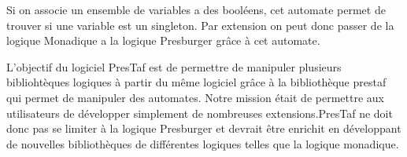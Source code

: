 Si on associe un ensemble de variables a des booléens, cet automate permet de trouver si une variable est un singleton. Par extension on peut donc passer de la logique Monadique a la logique Presburger grâce à cet automate.\\\par

L'objectif du logiciel PresTaf est de permettre de manipuler plusieurs bibliohtèques logiques à partir du même logiciel grâce à la bibliothèque prestaf qui permet de manipuler des automates. Notre mission était de permettre aux utilisateurs de développer simplement de nombreuses extensions.PresTaf ne doit donc pas se limiter à la logique Presburger et devrait être enrichit en développant de nouvelles bibliothèques de différentes logiques telles que la logique monadique. 
